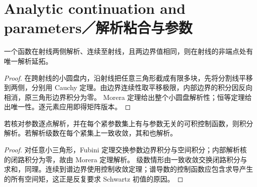 \section{Analytic continuation and parameters／解析粘合与参数}
\begin{lemma}
一个函数在射线两侧解析、连续至射线，且两边界值相同，则在射线的非端点处有唯一解析延拓。
\end{lemma}
\begin{proof}
在跨射线的小圆盘内，沿射线把任意三角形截成有限多块，先将分割线平移到两侧，分别用 Cauchy 定理。由边界连续性取平移极限，内部边界的积分因反向相消，原三角形边界积分为零。
Morera 定理给出整个小圆盘解析性；恒等定理给出唯一性。逐元素应用即得矩阵版本。
\end{proof}
\begin{lemma}
若核对参数逐点解析，并在每个紧参数集上有与参数无关的可积控制函数，则积分解析。若解析级数在每个紧集上一致收敛，其和也解析。
\end{lemma}
\begin{proof}
对任意小三角形，Fubini 定理交换参数边界积分与空间积分；内部解析核的闭路积分为零，故由 Morera 定理解析。
级数情形由一致收敛交换闭路积分与求和，同理。连续到谱边界使用控制收敛定理；谱导数的控制函数应包含求导产生的所有空间矩，这正是反复要求 Schwartz 初值的原因。
\end{proof}
